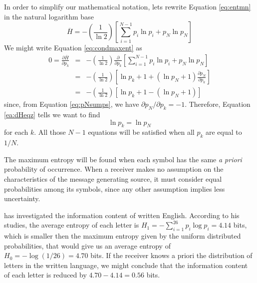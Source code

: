 In order to simplify our mathematical notation, lets rewrite Equation \ref{eq:entmn}
in the natural logarithm base
\begin{equation}
\label{eq:entmne}
\overline{H} = - \left( \frac{1}{\ln 2} \right) \left[ \sum_{i=1}^{N-1} p_i \ln p_i + p_N \ln p_N \right]
\end{equation}
We might write Equation \ref{eq:condmaxent} as
\begin{eqnarray}
\label{ea:dHeqz}
0 = \frac{\partial \overline{H}}{ \partial p_k } &=&  - \left( \frac{1}{\ln 2} \right) \frac{\partial}{ \partial p_k } \left[ \sum_{i=1}^{N-1} p_i \ln p_i  + p_N \ln p_N \right] \nonumber \\
   &=& - \left( \frac{1}{\ln 2} \right) \left[ \ln p_k + 1 + (\ln p_N + 1) \frac{\partial p_N}{ \partial p_k }  \right] \nonumber \\
   &=& - \left( \frac{1}{\ln 2} \right) \left[ \ln p_k + 1 - (\ln p_N + 1) \right] 
\end{eqnarray}
since, from Equation \ref{eq:pNsumps}, we have $\partial p_N / \partial p_k = -1$.  
Therefore, Equation \ref{ea:dHeqz} tells we want to find 
\begin{equation}
\ln p_k = \ln p_N
\end{equation}
for each $k$. All those $N-1$ equations will be satisfied when all $p_k$ are equal
to $1/N$. 

The maximum entropy will be found when each symbol has the same \emph{a priori} probability 
of occurrence. When a receiver makes no assumption on the characteristics of the
message generating source, it must consider equal probabilities among its symbols,
since any other assumption implies less uncertainty.

\cite{shannon1951} has investigated the information content of written English.
According to his studies, the average entropy of each letter is 
$H_1 = - \sum_{i=1}^{26} p_i \log p_i = 4.14$ bits, which
is smaller then the maximum entropy given by the uniform distributed probabilities,
that would give us an average entropy of $H_0 = -\log (1/26) = 4.70$ bits.
If the receiver knows a priori the distribution of letters in the written language,
we might conclude that the information content of each letter is reduced by
$4.70 - 4.14 = 0.56$ bits.

